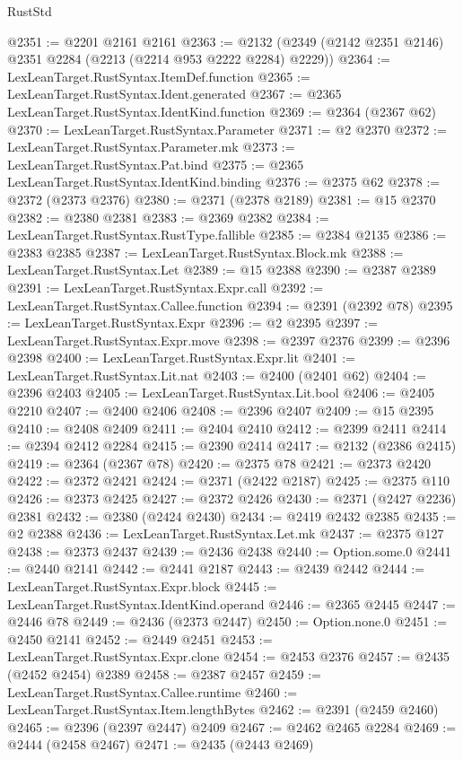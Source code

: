 \begin{lexlean}{RustStd}
\begin{coremodule}
@2351 := @2201 @2161 @2161
@2363 := @2132 (@2349 (@2142 @2351 @2146) @2351 @2284 (@2213 (@2214 @953 @2222 @2284) @2229))
@2364 := LexLeanTarget.RustSyntax.ItemDef.function
@2365 := LexLeanTarget.RustSyntax.Ident.generated
@2367 := @2365 LexLeanTarget.RustSyntax.IdentKind.function
@2369 := @2364 (@2367 @62)
@2370 := LexLeanTarget.RustSyntax.Parameter
@2371 := @2 @2370
@2372 := LexLeanTarget.RustSyntax.Parameter.mk
@2373 := LexLeanTarget.RustSyntax.Pat.bind
@2375 := @2365 LexLeanTarget.RustSyntax.IdentKind.binding
@2376 := @2375 @62
@2378 := @2372 (@2373 @2376)
@2380 := @2371 (@2378 @2189)
@2381 := @15 @2370
@2382 := @2380 @2381
@2383 := @2369 @2382
@2384 := LexLeanTarget.RustSyntax.RustType.fallible
@2385 := @2384 @2135
@2386 := @2383 @2385
@2387 := LexLeanTarget.RustSyntax.Block.mk
@2388 := LexLeanTarget.RustSyntax.Let
@2389 := @15 @2388
@2390 := @2387 @2389
@2391 := LexLeanTarget.RustSyntax.Expr.call
@2392 := LexLeanTarget.RustSyntax.Callee.function
@2394 := @2391 (@2392 @78)
@2395 := LexLeanTarget.RustSyntax.Expr
@2396 := @2 @2395
@2397 := LexLeanTarget.RustSyntax.Expr.move
@2398 := @2397 @2376
@2399 := @2396 @2398
@2400 := LexLeanTarget.RustSyntax.Expr.lit
@2401 := LexLeanTarget.RustSyntax.Lit.nat
@2403 := @2400 (@2401 @62)
@2404 := @2396 @2403
@2405 := LexLeanTarget.RustSyntax.Lit.bool
@2406 := @2405 @2210
@2407 := @2400 @2406
@2408 := @2396 @2407
@2409 := @15 @2395
@2410 := @2408 @2409
@2411 := @2404 @2410
@2412 := @2399 @2411
@2414 := @2394 @2412 @2284
@2415 := @2390 @2414
@2417 := @2132 (@2386 @2415)
@2419 := @2364 (@2367 @78)
@2420 := @2375 @78
@2421 := @2373 @2420
@2422 := @2372 @2421
@2424 := @2371 (@2422 @2187)
@2425 := @2375 @110
@2426 := @2373 @2425
@2427 := @2372 @2426
@2430 := @2371 (@2427 @2236) @2381
@2432 := @2380 (@2424 @2430)
@2434 := @2419 @2432 @2385
@2435 := @2 @2388
@2436 := LexLeanTarget.RustSyntax.Let.mk
@2437 := @2375 @127
@2438 := @2373 @2437
@2439 := @2436 @2438
@2440 := Option.some.{0}
@2441 := @2440 @2141
@2442 := @2441 @2187
@2443 := @2439 @2442
@2444 := LexLeanTarget.RustSyntax.Expr.block
@2445 := LexLeanTarget.RustSyntax.IdentKind.operand
@2446 := @2365 @2445
@2447 := @2446 @78
@2449 := @2436 (@2373 @2447)
@2450 := Option.none.{0}
@2451 := @2450 @2141
@2452 := @2449 @2451
@2453 := LexLeanTarget.RustSyntax.Expr.clone
@2454 := @2453 @2376
@2457 := @2435 (@2452 @2454) @2389
@2458 := @2387 @2457
@2459 := LexLeanTarget.RustSyntax.Callee.runtime
@2460 := LexLeanTarget.RustSyntax.Item.lengthBytes
@2462 := @2391 (@2459 @2460)
@2465 := @2396 (@2397 @2447) @2409
@2467 := @2462 @2465 @2284
@2469 := @2444 (@2458 @2467)
@2471 := @2435 (@2443 @2469)

\end{coremodule}
\end{lexlean}
